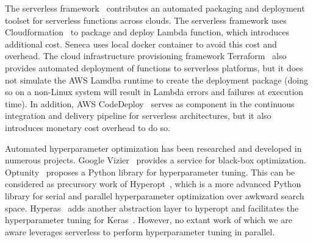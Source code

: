 The serverless framework~\cite{ref:serverless_framework} contributes an 
automated packaging and deployment toolset for serverless functions across clouds. 
The serverless framework uses Cloudformation~\cite{ref:cloudformation} to package and deploy Lambda function, which introduces additional cost. Seneca uses local docker container to avoid this cost
and overhead. The cloud infrastructure provisioning framework Terraform~\cite{ref:terraform} 
also provides automated deployment of functions to serverless platforms, but it does not simulate the AWS Lamdba runtime to create the deployment package (doing so on a non-Linux system will result in Lambda errors and failures at execution time). 
In addition, AWS CodeDeploy~\cite{ref:codedeploy} serves as component in the continuous integration and delivery pipeline for serverless architectures, but it also introduces monetary cost overhead
to do so.

Automated hyperparameter optimization has been researched and developed 
in numerous projects. Google Vizier~\cite{ref:vizier} provides a service for 
black-box optimization. Optunity~\cite{ref:claesen2014hyperparameter} 
proposes a Python library for hyperparameter tuning. 
This can be considered as precursory work of Hyperopt~\cite{ref:hyperopt}, 
which is a more advanced Python library for serial and parallel hyperparameter 
optimization over awkward search space. Hyperas~\cite{ref:hyperas} adds another 
abstraction layer to hyperopt and facilitates the hyperparameter tuning for 
Keras~\cite{ref:keras}. However, no extant work of which we are aware leverages
serverless to perform hyperparameter tuning in parallel. 
